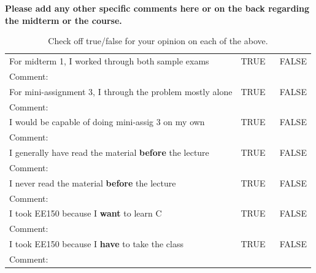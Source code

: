 {\bf Please add any other specific comments here or on the back regarding the
midterm or the course. }

\begin{table}[t]
\begin{center}\begin{tabular}{|ll|}\hline\hline
For midterm 1, I worked through both sample exams & TRUE ~~ FALSE \\ 
Comment:~ & ~ \\ \hline
For mini-assignment 3, I through the problem mostly alone & TRUE ~~ FALSE \\ 
Comment:~ & ~ \\ \hline
I would be capable of doing mini-assig 3 on my own & TRUE ~~ FALSE \\ 
Comment:~ & ~ \\ \hline
I generally have read the material {\bf before} the lecture & TRUE ~~ FALSE \\ 
Comment:~ & ~ \\ \hline
I never read the material {\bf before} the lecture & TRUE ~~ FALSE \\ 
Comment:~ & ~ \\ \hline
I took EE150 because I {\bf want} to learn C & TRUE ~~ FALSE \\ 
Comment:~ & ~ \\ \hline
I took EE150 because I {\bf have} to take the class & TRUE ~~ FALSE \\ 
Comment:~ & ~ \\ \hline
\end{tabular}\end{center}
\caption{Check off true/false for your opinion on each of the above.}
\end{table}

